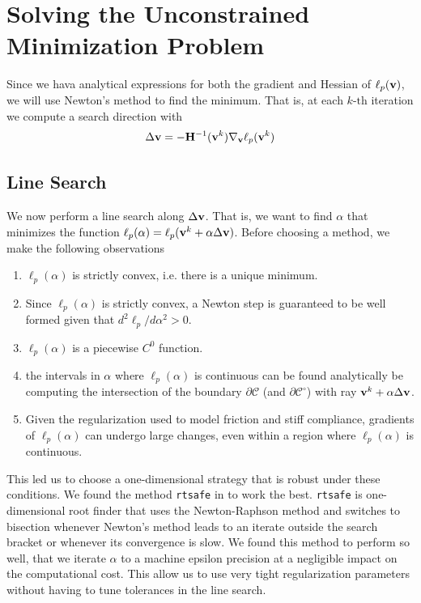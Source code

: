 
\section{Solving the Unconstrained Minimization Problem}
\label{sec:solver_details}

Since we hava analytical expressions for both the gradient and Hessian of
$\ell_p({\mathbf{v}})$, we will use Newton's method to find the minimum. That is, at
each $k\text{-th}$ iteration we compute a search direction with
\begin{equation}
	\Delta\mf{v} = -\mf{H}^{-1}(\mf{v}^k)\nabla_\mf{v}\ell_p(\mf{v}^k)
	\label{eq:Newton_iteration}
\end{equation}

\subsection{Line Search}
We now perform a line search along $\Delta{\mathbf{v}}$. That is, we want to find
$\alpha$ that minimizes the function
$\ell_p(\alpha)=\ell_p({\mathbf{v}}^k+\alpha\Delta{\mathbf{v}})$. Before choosing a method,
we make the following observations
\begin{enumerate}
	\item $\ell_p(\alpha)$ is strictly convex, i.e. there is a unique minimum.
	\item Since $\ell_p(\alpha)$ is strictly convex, a Newton step is guaranteed
	to be well formed given that $d^2\ell_p/d\alpha^2>0$.
	\item $\ell_p(\alpha)$ is a piecewise $C^0$ function.
	\item the intervals in $\alpha$ where $\ell_p(\alpha)$ is continuous can be
	found analytically be computing the intersection of the boundary
	$\partial\mathcal{C}$ (and $\partial\mathcal{C}^\circ$) with ray
	${\mathbf{v}}^k+\alpha\Delta{\mathbf{v}}$.
	\item Given the regularization used to model friction and stiff compliance,
	gradients of $\ell_p(\alpha)$ can undergo large changes, even within a
	region where $\ell_p(\alpha)$ is continuous.
\end{enumerate}

This led us to choose a one-dimensional strategy that is robust under these
conditions. We found the method \verb;rtsafe; in \cite[\S
9.4]{bib:numerical_recipes} to work the best. \verb;rtsafe; is one-dimensional
root finder that uses the Newton-Raphson method and switches to bisection
whenever Newton's method leads to an iterate outside the search bracket or
whenever its convergence is slow. We found this method to perform so well, that
we iterate $\alpha$ to a machine epsilon precision at a negligible impact on the
computational cost. This allow us to use very tight regularization parameters
without having to tune tolerances in the line search.

